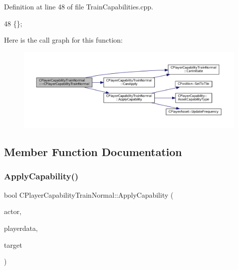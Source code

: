 Definition at line 48 of file Train\+Capabilities.\+cpp.


\begin{DoxyCode}
48 \{\};
\end{DoxyCode}
Here is the call graph for this function\+:\nopagebreak
\begin{figure}[H]
\begin{center}
\leavevmode
\includegraphics[width=350pt]{classCPlayerCapabilityTrainNormal_a1cc40f48e17f7e7fab3af09a85b4eb0f_cgraph}
\end{center}
\end{figure}


\subsection{Member Function Documentation}
\hypertarget{classCPlayerCapabilityTrainNormal_a04ed166d2072d44ddc96735ac1beb9bc}{}\label{classCPlayerCapabilityTrainNormal_a04ed166d2072d44ddc96735ac1beb9bc} 
\subsubsection{\texorpdfstring{Apply\+Capability()}{ApplyCapability()}}
{\footnotesize\ttfamily bool C\+Player\+Capability\+Train\+Normal\+::\+Apply\+Capability (\begin{DoxyParamCaption}\item[{std\+::shared\+\_\+ptr$<$ \hyperlink{classCPlayerAsset}{C\+Player\+Asset} $>$}]{actor,  }\item[{std\+::shared\+\_\+ptr$<$ \hyperlink{classCPlayerData}{C\+Player\+Data} $>$}]{playerdata,  }\item[{std\+::shared\+\_\+ptr$<$ \hyperlink{classCPlayerAsset}{C\+Player\+Asset} $>$}]{target }\end{DoxyParamCaption})\hspace{0.3cm}{\ttfamily [virtual]}}



